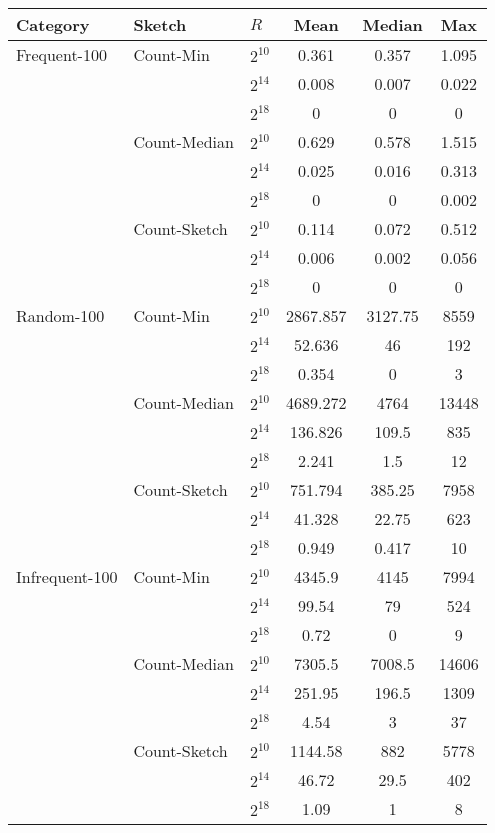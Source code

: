 \begin{tabular}{lllccc}
\toprule
Category & Sketch & $R$ & Mean & Median & Max \\
\midrule
Frequent-100 & Count-Min & $2^{10}$ & 0.361 & 0.357 & 1.095 \\
 &  & $2^{14}$ & 0.008 & 0.007 & 0.022 \\
 &  & $2^{18}$ & 0 & 0 & 0 \\
 & Count-Median & $2^{10}$ & 0.629 & 0.578 & 1.515 \\
 &  & $2^{14}$ & 0.025 & 0.016 & 0.313 \\
 &  & $2^{18}$ & 0 & 0 & 0.002 \\
 & Count-Sketch & $2^{10}$ & 0.114 & 0.072 & 0.512 \\
 &  & $2^{14}$ & 0.006 & 0.002 & 0.056 \\
 &  & $2^{18}$ & 0 & 0 & 0 \\
\midrule
Random-100 & Count-Min & $2^{10}$ & 2867.857 & 3127.75 & 8559 \\
 &  & $2^{14}$ & 52.636 & 46 & 192 \\
 &  & $2^{18}$ & 0.354 & 0 & 3 \\
 & Count-Median & $2^{10}$ & 4689.272 & 4764 & 13448 \\
 &  & $2^{14}$ & 136.826 & 109.5 & 835 \\
 &  & $2^{18}$ & 2.241 & 1.5 & 12 \\
 & Count-Sketch & $2^{10}$ & 751.794 & 385.25 & 7958 \\
 &  & $2^{14}$ & 41.328 & 22.75 & 623 \\
 &  & $2^{18}$ & 0.949 & 0.417 & 10 \\
\midrule
Infrequent-100 & Count-Min & $2^{10}$ & 4345.9 & 4145 & 7994 \\
 &  & $2^{14}$ & 99.54 & 79 & 524 \\
 &  & $2^{18}$ & 0.72 & 0 & 9 \\
 & Count-Median & $2^{10}$ & 7305.5 & 7008.5 & 14606 \\
 &  & $2^{14}$ & 251.95 & 196.5 & 1309 \\
 &  & $2^{18}$ & 4.54 & 3 & 37 \\
 & Count-Sketch & $2^{10}$ & 1144.58 & 882 & 5778 \\
 &  & $2^{14}$ & 46.72 & 29.5 & 402 \\
 &  & $2^{18}$ & 1.09 & 1 & 8 \\
\bottomrule
\end{tabular}